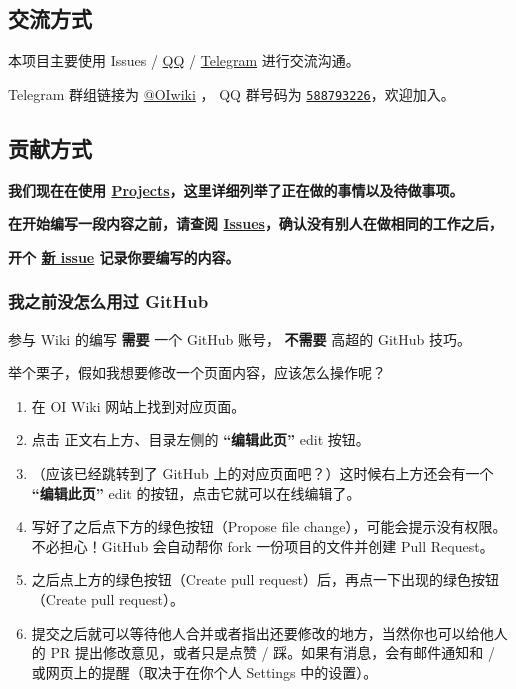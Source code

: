 
\subsection{交流方式}

本项目主要使用 Issues / \href{https://jq.qq.com/?_wv=1027&k=5EfkM6K}{QQ} / \href{https://t.me/OIwiki}{Telegram} 进行交流沟通。

Telegram 群组链接为 \href{https://t.me/OIwiki}{@OIwiki} ， QQ 群号码为 \href{https://jq.qq.com/?_wv=1027&k=5EfkM6K}{\texttt{588793226}}，欢迎加入。

\subsection{贡献方式}

\textbf{我们现在在使用 \href{https://github.com/24OI/OI-wiki/projects}{Projects}，这里详细列举了正在做的事情以及待做事项。}

\textbf{在开始编写一段内容之前，请查阅 \href{https://github.com/24OI/OI-wiki/issues}{Issues}，确认没有别人在做相同的工作之后，}

\textbf{开个 \href{https://github.com/24OI/OI-wiki/issues/new}{新 issue} 记录你要编写的内容。}

\subsubsection{我之前没怎么用过 GitHub}

参与 Wiki 的编写 \textbf{ 需要 } 一个 GitHub 账号， \textbf{ 不需要 } 高超的 GitHub 技巧。

举个栗子，假如我想要修改一个页面内容，应该怎么操作呢？

\begin{enumerate}
\item 在 OI Wiki 网站上找到对应页面。
\item 点击 正文右上方、目录左侧的 \textbf{“编辑此页”} edit 按钮。
\item （应该已经跳转到了 GitHub 上的对应页面吧？）这时候右上方还会有一个 \textbf{“编辑此页”} edit 的按钮，点击它就可以在线编辑了。
\item 写好了之后点下方的绿色按钮（Propose file change），可能会提示没有权限。不必担心！GitHub 会自动帮你 fork 一份项目的文件并创建 Pull Request。
\item 之后点上方的绿色按钮（Create pull request）后，再点一下出现的绿色按钮（Create pull request）。
\item 提交之后就可以等待他人合并或者指出还要修改的地方，当然你也可以给他人的 PR 提出修改意见，或者只是点赞 / 踩。如果有消息，会有邮件通知和 / 或网页上的提醒（取决于在你个人 Settings 中的设置）。
\end{enumerate}

